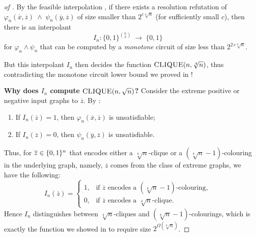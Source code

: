 \begin{proof}[of ]
By the feasible interpolation , if there exists a resolution refutation of 
\(\varphi_n(\overline{x},\overline{z}) \;\wedge\; \psi_n(\overline{y},\overline{z})\)
of size smaller than \(2^{c\sqrt[8]{n}}\) (for sufficiently small \(c\)), then there is an interpolant 
\[
I_n : \{0,1\}^{n \choose 2} \;\longrightarrow\; \{0,1\}
\]
for \(\varphi_n \wedge \psi_n\) that can be computed by a \emph{monotone} circuit of size less than \(2^{2\,c\sqrt[8]{n}}\).

But this interpolant \(I_n\) then decides the function 
\(\textsc{CLIQUE}(n,\sqrt[4]{n})\), thus contradicting the monotone circuit lower bound we proved in !

\medskip

\noindent
\textbf{Why does \(I_n\) compute \(\textsc{CLIQUE}(n,\sqrt{n})\)?}
Consider the extreme positive or negative input graphs to \(\overline{z}\). By :
\begin{enumerate}[label=\textbf{(\alph*)}]
    \item If \(I_n(\overline{z}) = 1\), then \(\varphi_n(\overline{x},\overline{z})\) is unsatisfiable;
    \item If \(I_n(\overline{z}) = 0\), then \(\psi_n(\overline{y},\overline{z})\) is unsatisfiable.
\end{enumerate}

Thus, for \(\overline{z}\in\{0,1\}^n\) that encodes either a \(\sqrt[4]{n}\)-clique or a \((\sqrt[4]{n}-1)\)-colouring in the underlying graph, namely, $\overline{z}$ comes from the class of extreme graphs, we have the following:
\[
I_n(\overline{z}) = 
\begin{cases}
1, & \text{if }\overline{z}\text{ encodes a }(\sqrt[4]{n}-1)\text{-colouring},\\
0, & \text{if }\overline{z}\text{ encodes a }\sqrt[4]{n}\text{-clique}.
\end{cases}
\]
Hence \(I_n\) distinguishes between \(\sqrt[4]{n}\)-cliques and \((\sqrt[4]{n}-1)\)-colourings, which is exactly the function we showed in  to require size $2^{\Omega(\sqrt[8]{n})}$. 
\end{proof}

\bigskip 


